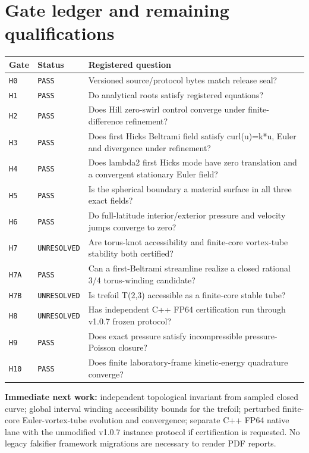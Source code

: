 \documentclass[10pt,a4paper]{article}
\begin{document}
\section{Gate ledger and remaining qualifications}
\small
\begin{longtable}{@{}p{12mm}p{24mm}p{112mm}@{}}
\toprule
Gate & Status & Registered question\\\midrule\endhead
\texttt{H0} & \texttt{PASS} & Versioned source/protocol bytes match release seal? \\
\texttt{H1} & \texttt{PASS} & Do analytical roots satisfy registered equations? \\
\texttt{H2} & \texttt{PASS} & Does Hill zero-swirl control converge under finite-difference refinement? \\
\texttt{H3} & \texttt{PASS} & Does first Hicks Beltrami field satisfy curl(u)=k*u, Euler and divergence under refinement? \\
\texttt{H4} & \texttt{PASS} & Does lambda2 first Hicks mode have zero translation and a convergent stationary Euler field? \\
\texttt{H5} & \texttt{PASS} & Is the spherical boundary a material surface in all three exact fields? \\
\texttt{H6} & \texttt{PASS} & Do full-latitude interior/exterior pressure and velocity jumps converge to zero? \\
\texttt{H7} & \texttt{UNRESOLVED} & Are torus-knot accessibility and finite-core vortex-tube stability both certified? \\
\texttt{H7A} & \texttt{PASS} & Can a first-Beltrami streamline realize a closed rational 3/4 torus-winding candidate? \\
\texttt{H7B} & \texttt{UNRESOLVED} & Is trefoil T(2,3) accessible as a finite-core stable tube? \\
\texttt{H8} & \texttt{UNRESOLVED} & Has independent C++ FP64 certification run through v1.0.7 frozen protocol? \\
\texttt{H9} & \texttt{PASS} & Does exact pressure satisfy incompressible pressure-Poisson closure? \\
\texttt{H10} & \texttt{PASS} & Does finite laboratory-frame kinetic-energy quadrature converge? \\
\bottomrule
\end{longtable}
\normalsize
\textbf{Immediate next work:} independent topological invariant from sampled closed curve; global interval winding accessibility bounds for the trefoil; perturbed finite-core Euler-vortex-tube evolution and convergence; separate C++ FP64 native lane with the unmodified v1.0.7 instance protocol if certification is requested. No legacy falsifier framework migrations are necessary to render PDF reports.
\end{document}
